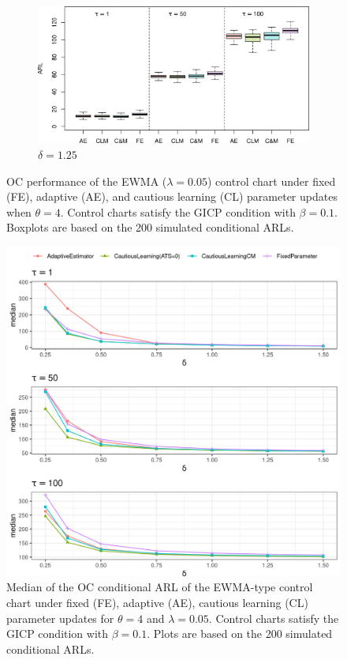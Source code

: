 \begin{figure}
\begin{subfigure}{0.49\textwidth}
\end{subfigure}
\begin{subfigure}{0.49\textwidth}
  \centering
  \caption{$ \delta = 1.25$}
  \label{fig:lambda=0.05/theta=4.0/delta=1.25}
  \includegraphics[width=\textwidth]{img/sims/theta=4.0_signedEWMA(l = 0.05, upw = true, L = 1.0)/delta=1.25.png}
\end{subfigure}
  \caption{OC performance of the EWMA ($ \lambda = 0.05$) control chart under fixed (FE), adaptive (AE), and cautious learning (CL) parameter updates when $ \theta = 4$.
    Control charts satisfy the GICP condition  with $ \beta = 0.1$.
  Boxplots are based on the 200 simulated conditional ARLs.}
  \label{fig:lambda=0.05/EWMA OC theta=4}
\end{figure}

\begin{figure}
  \includegraphics[width=\textwidth]{img/sims/theta=4.0_signedEWMA(l = 0.05, upw = true, L = 1.0)/OC-profiles.png}
  \caption{Median of the OC conditional ARL of the EWMA-type control chart under fixed (FE), adaptive (AE), cautious learning (CL) parameter updates for $ \theta = 4$ and $ \lambda = 0.05$.
    Control charts satisfy the GICP condition  with $ \beta = 0.1$.
  Plots are based on the 200 simulated conditional ARLs.}
  \label{fig:lambda=0.05/EWMA OC profiles}
\end{figure}

